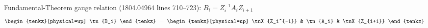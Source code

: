 \documentclass[varwidth=19cm, border=6pt]{standalone}
\begin{document}
Fundamental-Theorem gauge relation (1804.04964 lines 710--723):
$B_i = Z_i^{-1} A_i Z_{i+1}$
\[
  \begin{tenkz}[physical=up]
    \tn{B_i}
  \end{tenkz}
  \;=\;
  \begin{tenkz}[physical=up]
    \tnX{Z_i^{-1}} & \tn{A_i} & \tnX{Z_{i+1}}
  \end{tenkz}
\]
\end{document}
